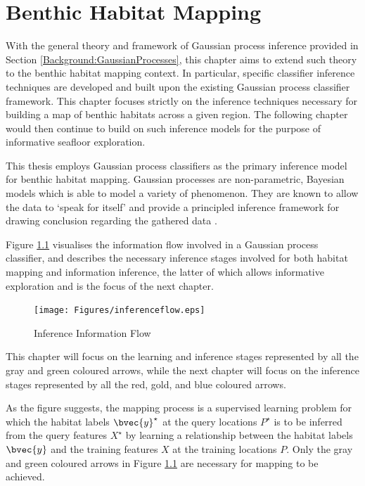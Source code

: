 \chapter{Benthic Habitat Mapping}
\label{BenthicHabitatMapping}
	
	With the general theory and framework of Gaussian process inference provided in Section \ref{Background:GaussianProcesses}, this chapter aims to extend such theory to the benthic habitat mapping context. In particular, specific classifier inference techniques are developed and built upon the existing Gaussian process classifier framework. This chapter focuses strictly on the inference techniques necessary for building a map of benthic habitats across a given region. The following chapter would then continue to build on such inference models for the purpose of informative seafloor exploration. 
	
	This thesis employs Gaussian process classifiers as the primary inference model for benthic habitat mapping. Gaussian processes are non-parametric, Bayesian models which is able to model a variety of phenomenon. They are known to allow the data to `speak for itself' and provide a principled inference framework for drawing conclusion regarding the gathered data \citep{GaussianProcessForMachineLearning}. 
	
	Figure \ref{Figure:InferenceFlow} visualises the information flow involved in a Gaussian process classifier, and describes the necessary inference stages involved for both habitat mapping and information inference, the latter of which allows informative exploration and is the focus of the next chapter.

	\begin{figure}[!htbp]
	\centering
		\texttt{[image: Figures/inferenceflow.eps]}
	\caption{Inference Information Flow}
	\label{Figure:InferenceFlow}
	\end{figure}	
			
	This chapter will focus on the learning and inference stages represented by all the {\color{Gray} gray} and {\color{ForestGreen} green} coloured arrows, while the next chapter will focus on the inference stages represented by all the {\color{OrangeRed} red}, {\color{YellowOrange} gold}, and {\color{Cerulean} blue} coloured arrows.
	
	As the figure suggests, the mapping process is a supervised learning problem for which the habitat labels $\bvec{y}^{\star}$ at the query locations $P^{\star}$ is to be inferred from the query features $X^{\star}$ by learning a relationship between the habitat labels $\bvec{y}$ and the training features $X$ at the training locations $P$. Only the {\color{Gray} gray} and {\color{ForestGreen} green} coloured arrows in Figure \ref{Figure:InferenceFlow} are necessary for mapping to be achieved.
	
